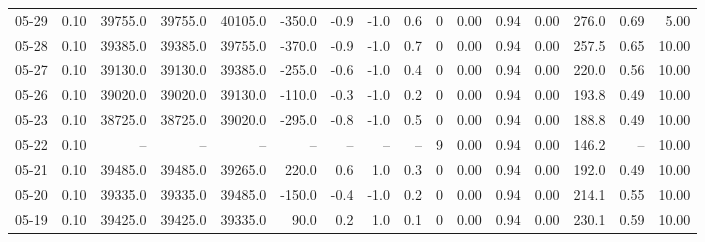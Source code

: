 \begin{threeparttable}
{\begin{tabular}{lrrrrrrrrrrrrrrr}
  05-29 &     0.10 & 39755.0 & 39755.0 & 40105.0 &     -350.0 &           -0.9 &                     -1.0 &                 0.6 &              0 &       0.00 &      0.94 &           0.00 &            276.0 &            0.69 &                   5.00 \\
  05-28 &     0.10 & 39385.0 & 39385.0 & 39755.0 &     -370.0 &           -0.9 &                     -1.0 &                 0.7 &              0 &       0.00 &      0.94 &           0.00 &            257.5 &            0.65 &                  10.00 \\
  05-27 &     0.10 & 39130.0 & 39130.0 & 39385.0 &     -255.0 &           -0.6 &                     -1.0 &                 0.4 &              0 &       0.00 &      0.94 &           0.00 &            220.0 &            0.56 &                  10.00 \\
  05-26 &     0.10 & 39020.0 & 39020.0 & 39130.0 &     -110.0 &           -0.3 &                     -1.0 &                 0.2 &              0 &       0.00 &      0.94 &           0.00 &            193.8 &            0.49 &                  10.00 \\
  05-23 &     0.10 & 38725.0 & 38725.0 & 39020.0 &     -295.0 &           -0.8 &                     -1.0 &                 0.5 &              0 &       0.00 &      0.94 &           0.00 &            188.8 &            0.49 &                  10.00 \\
  05-22 &     0.10 &      -- &      -- &      -- &         -- &             -- &                       -- &                  -- &              9 &       0.00 &      0.94 &           0.00 &            146.2 &              -- &                  10.00 \\
  05-21 &     0.10 & 39485.0 & 39485.0 & 39265.0 &      220.0 &            0.6 &                      1.0 &                 0.3 &              0 &       0.00 &      0.94 &           0.00 &            192.0 &            0.49 &                  10.00 \\
  05-20 &     0.10 & 39335.0 & 39335.0 & 39485.0 &     -150.0 &           -0.4 &                     -1.0 &                 0.2 &              0 &       0.00 &      0.94 &           0.00 &            214.1 &            0.55 &                  10.00 \\
  05-19 &     0.10 & 39425.0 & 39425.0 & 39335.0 &       90.0 &            0.2 &                      1.0 &                 0.1 &              0 &       0.00 &      0.94 &           0.00 &            230.1 &            0.59 &                  10.00 \\

\end{tabular}}
\end{threeparttable}
